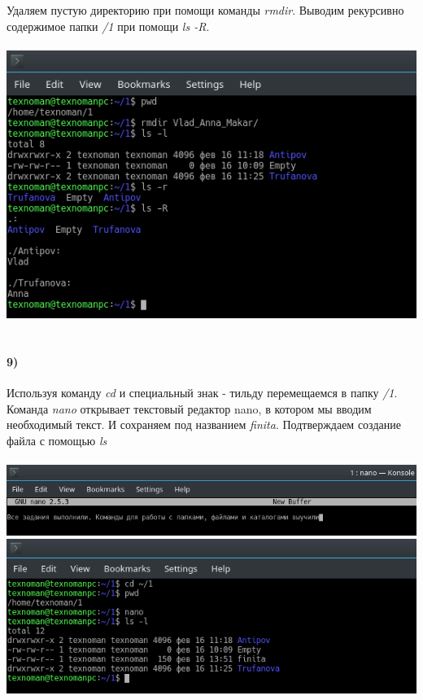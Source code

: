 	Удаляем пустую директорию при помощи команды \textit{rmdir}. Выводим рекурсивно содержимое папки \textit{/1} при помощи 
	\textit{ls -R}.\\
	\\
	\includegraphics[width=\textwidth]{10.png}
	\\
	\\

	\paragraph{9)}
	Используя команду \textit{cd} и специальный знак - тильду перемещаемся в папку \textit{/1}. 
	Команда \textit{nano} открывает текстовый редактор nano,  в котором мы вводим необходимый текст. И сохраняем под названием \textit{finita}. Подтверждаем создание файла с помощью \textit{ls}\\
	\\
	\includegraphics[width=\textwidth]{11.png}
	\\
	\includegraphics[width=\textwidth]{12.png}
	\\

